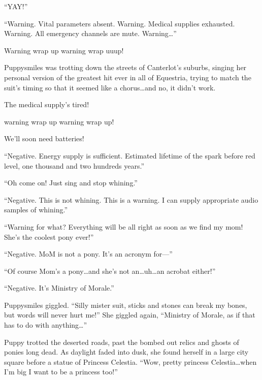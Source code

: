 ``YAY!''

\horizonline


``{\mt Warning. Vital parameters absent. Warning. Medical supplies exhausted. Warning. All emergency channels are mute. Warning\dots}''

\begin{song}
    Warning wrap up warning wrap uuup!
\end{song}

Puppysmiles was trotting down the streets of Canterlot's suburbs, singing her personal version of the greatest hit ever in all of Equestria, trying to match the suit's timing so that it seemed like a chorus\dots and no, it didn't work.

\begin{song}
    The medical supply's tired!
    
    warning wrap up warning wrap up!
    
    We'll soon need batteries!
\end{song}

``{\mt Negative. Energy supply is sufficient. Estimated lifetime of the spark before red level, one thousand and two hundreds years.}''

``Oh come on! Just sing and stop whining.''

``{\mt Negative. This is not whining. This is a warning. I can supply appropriate audio samples of whining.}''

``{\mt Warning for what? Everything will be all right as soon as we find my mom! She's the coolest pony ever!}''

``{\mt Negative. MoM is not a pony. It's an acronym for---}''

``Of course Mom's a pony\dots and she's not an\dots uh\dots an acrobat either!''

``{\mt Negative. It's Ministry of Morale.}''

Puppysmiles giggled. ``Silly mister suit, sticks and stones can break my bones, but words will never hurt me!'' She giggled again, ``Ministry of Morale, as if that has to do with anything\dots''

Puppy trotted the deserted roads, past the bombed out relics and ghosts of ponies long dead. As daylight faded into dusk, she found herself in a large city square before a statue of Princess Celestia. ``Wow, pretty princess Celestia\dots when I'm big I want to be a princess too!''

